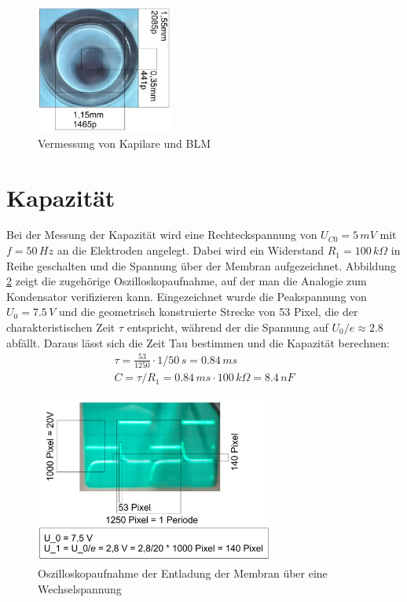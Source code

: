 \documentclass{include/thesisclass3}
\newcommand{\e}[1]{\,\si{#1}}
\begin{document}
\begin{figure}[ht]
	\begin{center}
		\includegraphics[width=0.4\textwidth]{images/Perle2.png}
		\caption{Vermessung von Kapilare und BLM}
		\label{Perle}
	\end{center}
\end{figure}

\section{Kapazität}
Bei der Messung der Kapazität wird eine Rechteckspannung von $U_{C0}=5\e{mV}$ mit $f=50\e{Hz}$ an die Elektroden angelegt. Dabei wird ein Widerstand $R_1=100\e{k\Omega}$ in Reihe geschalten und die Spannung über der Membran aufgezeichnet. Abbildung \ref{oszi} zeigt die zugehörige Oszilloskopaufnahme, auf der man die Analogie zum Kondensator verifizieren kann. Eingezeichnet wurde die Peakspannung von $U_0 = 7.5\e{V}$ und die geometrisch konstruierte Strecke von 53 Pixel, die der charakteristischen Zeit $\tau$ entspricht, während der die Spannung auf $U_0/\textit{e}\approx 2.8$ abfällt. Daraus lässt sich die Zeit Tau bestimmen und die Kapazität berechnen:
\begin{align*}
\tau = \frac{53}{1250} \cdot 1/50 \e{s}= 0.84 \e{ms}\\
C=\tau / R_1 = 0.84\e{ms} \cdot 100\e{k\Omega} = 8.4 \e{nF}
\end{align*}
\begin{figure}[ht]
	\begin{center}
		\includegraphics[width=0.7\textwidth]{images/measure.png}
		\caption{Oszilloskopaufnahme der Entladung der Membran über eine Wechselspannung}
		\label{oszi}
	\end{center}
\end{figure}
\end{document}
